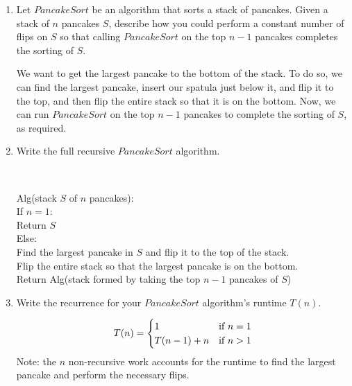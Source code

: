 \documentclass[11pt]{article}
\begin{document}
\begin{enumerate}
\begin{enumerate}
    \item Let $PancakeSort$ be an algorithm that sorts a stack of pancakes. Given a stack of
    $n$ pancakes $S$, describe how you could perform a constant number of flips on $S$
    so that calling $PancakeSort$ on the top $n-1$ pancakes completes the sorting of $S$.
    \begin{Solution}
        We want to get the largest pancake to the bottom of the stack. To do so,
        we can find the largest pancake, insert our spatula just below it, and flip it to the
        top, and then flip the entire stack so that it is on the bottom.
        Now, we can run $PancakeSort$ on the top $n-1$ pancakes to complete the sorting of $S$,
        as required.
    \end{Solution}
    \newpage
    \item Write the full recursive $PancakeSort$ algorithm.

    \begin{Solution}~

        \begin{algo}
            Alg(stack $S$ of $n$ pancakes):\+ \\
                If $n = 1$: \+ \\
                    Return $S$ \- \\
                Else: \+ \\
                    Find the largest pancake in $S$ and flip it to the top of
                    the stack. \\
                    Flip the entire stack so that the largest pancake is on the bottom. \\
                    Return Alg(stack formed by taking the top $n-1$ pancakes of $S$)
        \end{algo}
    \end{Solution}
    \item Write the recurrence for your $PancakeSort$ algorithm's runtime $T(n)$.
    \begin{Solution}
        \begin{equation*}
            T(n) =
            \begin{cases}
            1 & $if $ n = 1 \\
            T(n-1) + n & $if $ n > 1 \\
            \end{cases}
        \end{equation*}
        Note: the $n$ non-recursive work accounts for the runtime to find the
        largest pancake and perform the necessary flips.
    \end{Solution}
\end{enumerate}


\end{enumerate}
\end{document}
